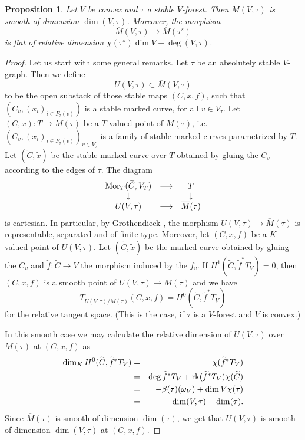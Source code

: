 \documentclass[11pt]{amsart}
\newtheorem{prop}{Proposition}[section]
\theoremstyle{definition}
\theoremstyle{remark}
\newenvironment{pf}{\begin{proof}}{\end{proof}}
\renewcommand{\tilde}{\widetilde}
\newcommand{\upst}{^{\ast}}
\newcommand{\rk}{\operatorname{\rm rk}}
\newcommand{\Mor}{\operatorname{\rm Mor}\nolimits}
\newcommand{\ol}{\overline}
\newcommand{\ldiag}[1]
       {\makebox[0cm]{\({\scriptstyle#1}\downarrow\phantom{\scriptstyle#1}\)}}
\newcommand{\rdiag}[1]
       {\makebox[0cm]{\(\phantom{\scriptstyle#1}\downarrow{\scriptstyle#1}\)}}
\newcommand{\comdia}[9]{
\begin{array}{ccc}
#1 & \stackrel{#2}{\longrightarrow} & #3 \\
\ldiag{#4} & #5 & \rdiag{#6} \\
#7 & \stackrel{#8}{\longrightarrow} & #9
\end{array}}
\renewcommand{\t}{_{\tau}}
\theoremstyle{plain}
\theoremstyle{definition}
\theoremstyle{remark}
\begin{document}
\begin{prop}
Let \(V\) be convex and \(\tau\) a stable \(V\)-forest. Then \(\ol{M}(V,\tau)\) is
smooth of dimension \(\dim(V,\tau)\). Moreover,
the morphism
\[
\ol{M}(V,\tau)\longrightarrow\ol{M}(\tau^s)
\]
is flat of relative dimension \(\chi(\tau^s)\dim V-\deg(V,\tau)\).
\end{prop}
\begin{pf}
Let us start with some general remarks. Let \(\tau\) be an absolutely stable
\(V\)-graph. Then we define
\[
U(V,\tau)\subset\ol{M}(V,\tau)
\]
to be the open substack of those stable maps \((C,x,f)\), such that
\((C_v,(x_i)_{i\in F\t(v)})\) is  a stable marked curve,
for all \(v\in V\t\).  Let \((C,x):T\rightarrow\ol{M}(\tau)\) be  a \(T\)-valued
point of \(\ol{M}(\tau)\), i.e.\
\((C_v,(x_i)_{i\in F\t(v)})_{v\in V\t}\) is a family of stable marked curves
parametrized by \(T\). Let
\((\tilde{C},\tilde{x})\) be the stable marked curve over \(T\) obtained by gluing
the \(C_v\) according to the edges of
\(\tau\). The diagram
\[
\comdia{\Mor_T(\tilde{C},V_T)}{}{T}{}{}{}{U(V,\tau)}{}{\ol{M}(\tau)}
\]
is cartesian. In particular, by Grothendieck \cite{fgaIV}, the morphism
\(U(V,\tau)\rightarrow\ol{M}(\tau)\) is
representable, separated and of finite type. Moreover, let \((C,x,f)\) be a
\(K\)-valued point of \(U(V,\tau)\). Let
\((\tilde{C},\tilde{x})\) be the marked curve obtained by gluing the \(C_v\) and
\(\tilde{f}:\tilde{C}\rightarrow V\)
the morphism induced by the \(f_v\). If \(H^1(\tilde{C},\tilde{f}\upst T_V)=0\),
then \((C,x,f)\) is a smooth point of
\(U(V,\tau)\rightarrow\ol{M}(\tau)\) and we have
\[
T_{U(V,\tau)/\ol{M}(\tau)}(C,x,f)=H^0(\tilde{C},\tilde{f}\upst T_V)
\]
for the relative tangent space. (This is the case, if \(\tau\) is a \(V\)-forest
and \(V\) is convex.)

In this smooth case we may calculate the relative dimension of \(U(V,\tau)\) over
\(\ol{M}(\tau)\) at \((C,x,f)\) as
\begin{eqnarray*}
\dim_K H^0(\tilde{C},\tilde{f}\upst T_V)  & = & \chi(\tilde{f}\upst T_V) \\
& = & \deg\tilde{f}\upst T_V + \rk(\tilde{f}\upst T_V)\chi(\tilde{C}) \\
& = & -\beta(\tau)(\omega_V) + \dim V \chi(\tau) \\
& = & \dim(V,\tau)-\dim(\tau).
\end{eqnarray*}
Since \(\ol{M}(\tau)\) is smooth of dimension \(\dim(\tau)\), we get that
\(U(V,\tau)\) is smooth of dimension \(\dim(V,\tau)\)
at \((C,x,f)\).


\end{pf}
\end{document}
